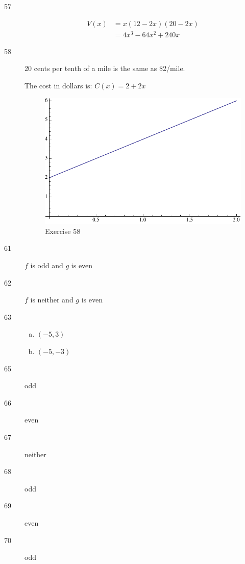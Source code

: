 \documentclass[letterpaper]{exam}
\begin{document}
\begin{description}

      \item[57]
        \begin{align*}
          V(x) & = x (12 - 2x) (20 - 2x) \\
               & = 4 x^3-64 x^2+240 x \end{align*}

      \item[58]
        20 cents per tenth of a mile is the same as \$2/mile.

        The cost in dollars is: $C(x) = 2 + 2 x$

        \begin{figure}[H]
          \centering
          \includegraphics[scale = 0.5]{ex58.pdf}
          \caption{Exercise 58}
          \label{fig:ex58}
        \end{figure}

      \item[61] $f$ is odd and $g$ is even 

      \item[62] $f$ is neither and $g$ is even

      \item[63]
        \begin{enumerate}[(a)]
          \item $(-5, 3)$
          \item $(-5, -3)$
        \end{enumerate}

      \item[65] odd
      \item[66] even
      \item[67] neither
      \item[68] odd
      \item[69] even
      \item[70] odd
        
    \end{description}
\end{document}
